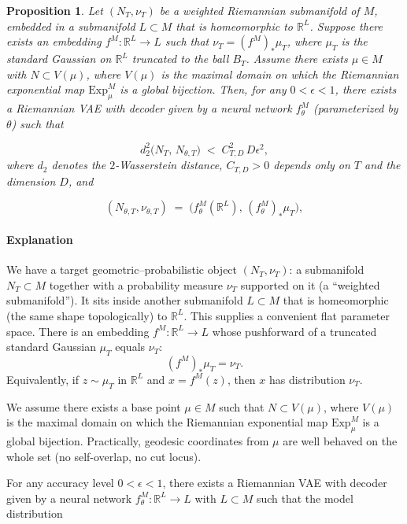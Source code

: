 \documentclass{article}
\newtheorem{proposition}{Proposition}
\begin{document}
\begin{proposition}

Let \((N_T,\nu_T)\) be a weighted Riemannian submanifold of \(M\), embedded in a submanifold \(L\subset M\) that is homeomorphic to \(\mathbb{R}^L\). Suppose there exists an embedding \(f^M:\mathbb{R}^L\to L\) such that \(\nu_T=(f^M)_*\mu_T\), where \(\mu_T\) is the standard Gaussian on \(\mathbb{R}^L\) truncated to the ball \(B_T\). Assume there exists \(\mu\in M\) with \(N\subset V(\mu)\), where \(V(\mu)\) is the maximal domain on which the Riemannian exponential map \(\mathrm{Exp}_\mu^M\) is a global bijection. Then, for any \(0<\epsilon<1\), there exists a Riemannian VAE with decoder given by a neural network \(f^M_\theta\) (parameterized by \(\theta\)) such that

\[
d_2^2\bigl(N_T,\,N_{\theta,T}\bigr)\;<\;C^2_{T,D}\,D\epsilon^{2},
\]
where \(d_2\) denotes the \(2\)-Wasserstein distance, \(C_{T,D}>0\) depends only on \(T\) and the dimension \(D\), and

\[
    (N_{\theta,T}, \nu_{\theta,T}) \;=\;\bigl(f^M_\theta(\mathbb{R}^L),\, (f^M_\theta)_* \mu_T\bigr),
\]

\end{proposition}

\paragraph{Explanation}
We have a target geometric--probabilistic object \((N_T,\nu_T)\): a submanifold \(N_T\subset M\) together with a probability measure \(\nu_T\) supported on it (a “weighted submanifold”). It sits inside another submanifold \(L\subset M\) that is homeomorphic (the same shape topologically) to \(\mathbb{R}^L\). This supplies a convenient flat parameter space. There is an embedding \(f^M:\mathbb{R}^L\to L\) whose pushforward of a truncated standard Gaussian \(\mu_T\) equals \(\nu_T\):
\[
(f^M)_*\mu_T=\nu_T.
\]
Equivalently, if \(z\sim \mu_T\) in \(\mathbb{R}^L\) and \(x=f^M(z)\), then \(x\) has distribution \(\nu_T\).

We assume there exists a base point \(\mu\in M\) such that \(N\subset V(\mu)\), where \(V(\mu)\) is the maximal domain on which the Riemannian exponential map \(\mathrm{Exp}_\mu^M\) is a global bijection. Practically, geodesic coordinates from \(\mu\) are well behaved on the whole set (no self-overlap, no cut locus).


For any accuracy level \(0<\epsilon<1\), there exists a Riemannian VAE with decoder given by a neural network \(f^M_\theta:\mathbb{R}^L\to L\) 
with $L \subset M$  such that the model distribution
\end{document}
